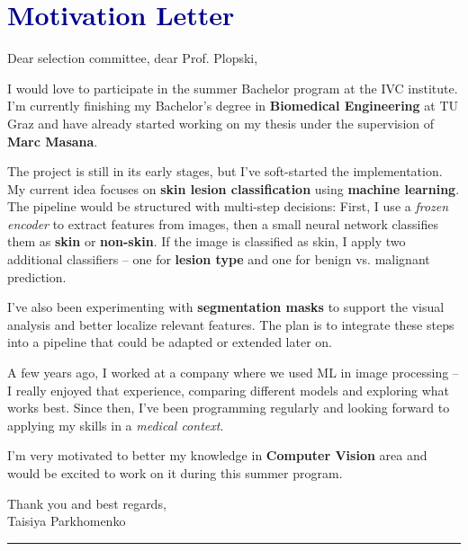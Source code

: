 \documentclass[10pt,a4paper]{article}
\begin{document}
\fancyfoot[C]{\thepage}
\pagestyle{fancy}

\vspace{4em}
\section*{\textcolor{darkblue}{\textbf{Motivation Letter}}}
\vspace{1em}

\noindent Dear selection committee, dear Prof. Plopski,

\vspace{1.5em}

I would love to participate in the summer Bachelor program at the IVC institute. I'm currently finishing my Bachelor's degree in \textbf{Biomedical Engineering} at TU Graz and have already started working on my thesis under the supervision of \textbf{Marc Masana}.

The project is still in its early stages, but I've soft-started the implementation. My current idea focuses on \textbf{skin lesion classification} using \textbf{machine learning}. The pipeline would be structured with multi-step decisions: First, I use a \textit{frozen encoder} to extract features from images, then a small neural network classifies them as \textbf{skin} or \textbf{non-skin}. If the image is classified as skin, I apply two additional classifiers – one for \textbf{lesion type} and one for benign vs. malignant prediction.

I've also been experimenting with \textbf{segmentation masks} to support the visual analysis and better localize relevant features. The plan is to integrate these steps into a pipeline that could be adapted or extended later on.

A few years ago, I worked at a company where we used ML in image processing – I really enjoyed that experience, comparing different models and exploring what works best. Since then, I've been programming regularly and looking forward to applying my skills in a \textit{medical context}.

I'm very motivated to better my knowledge in \textbf{Computer Vision} area and would be excited to work on it during this summer program.

\vspace{1.5em}

\noindent Thank you and best regards,\\
Taisiya Parkhomenko

\vspace{2em}
\hrule
\vspace{2em}
\end{document}

